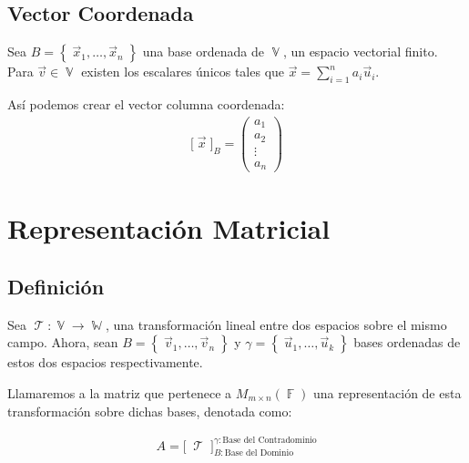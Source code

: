\documentclass[12pt, fleqn]{report}                             %
\theoremstyle{break}                                            %
\DeclareMathOperator \GenericField {\mathbb{F}}                 %
\DeclareMathOperator \VectorSet    {\mathbb{V}}                 %
\DeclareMathOperator \SubVectorSet {\mathbb{W}}                 %
\DeclareMathOperator \LinTrans      {\mathcal{T}}               %
\newcommand{\Set}[1]            {\left\{ \; #1 \; \right\}}     %
\newcommand{\bigBrackets}[1]    {\big[ \; #1 \; \big]}          %
\newcommand{\BigBrackets}[1]    {\Big[ \; #1 \; \Big]}          %
\newcommand{\pVector}[1]                                        %
        { \ensuremath{\begin{pmatrix}#1\end{pmatrix}} }             %
\begin{document}
            \subsection{Vector Coordenada}

                Sea $B = \Set{\vec x_1, \dots, \vec x_n}$ una base ordenada de $\VectorSet$, un espacio
                vectorial finito. Para $\vec v \in \VectorSet$ existen los escalares únicos
                tales que $\displaystyle \vec x = \sum_{i=1}^n a_i \vec u_i$.

                Así podemos crear el vector columna coordenada:
                \begin{align*}
                    \bigBrackets{\vec x}_{B}
                    =
                    \pVector{a_1 \\ a_2 \\ \vdots \\a_n}
                \end{align*}


        \clearpage
        \section{Representación Matricial}

            \subsection{Definición}

                Sea $\LinTrans: \VectorSet \to \SubVectorSet$, una transformación lineal
                entre dos espacios sobre el mismo campo.
                Ahora, sean $B = \Set{\vec v_1, \dots, \vec v_n}$ y $\gamma = \Set{\vec u_1, \dots, \vec u_k}$
                bases ordenadas de estos dos espacios respectivamente.

                Llamaremos a la matriz que pertenece a $M_{m \times n}(\GenericField)$ una
                representación de esta transformación sobre dichas bases, denotada como: 

                \begin{align*}
                    A = \BigBrackets{\LinTrans}_{B: \text{Base del Dominio}}^{\gamma: \text{Base del Contradominio}}
                \end{align*}
\end{document}
